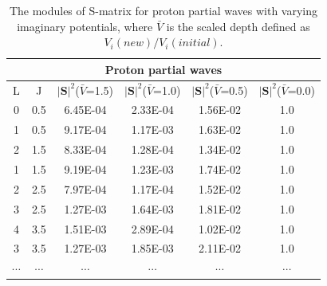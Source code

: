 	\begin{table}[]
\centering
\begin{tabular}{cccccc}
\toprule
\toprule
\multicolumn{6}{c}{Proton partial waves}                                                                         \\
 \midrule
L                     & J                     & $|\mathbf{S}|^2$($\bar{V}$=1.5) & $|\mathbf{S}|^2$($\bar{V}$=1.0) & $|\mathbf{S}|^2$($\bar{V}$=0.5) & $|\mathbf{S}|^2$($\bar{V}$=0.0) \\
0                     & 0.5                   & 6.45E-04                     & 2.33E-04                     & 1.56E-02                     & 1.0                          \\
1                     & 0.5                   & 9.17E-04                     & 1.17E-03                     & 1.63E-02                     & 1.0                          \\
2                     & 1.5                   & 8.33E-04                     & 1.28E-04                     & 1.34E-02                     & 1.0                          \\
1                     & 1.5                   & 9.19E-04                     & 1.23E-03                     & 1.74E-02                     & 1.0                          \\
2                     & 2.5                   & 7.97E-04                     & 1.17E-04                     & 1.52E-02                     & 1.0                          \\
3                     & 2.5                   & 1.27E-03                     & 1.64E-03                     & 1.81E-02                     & 1.0                          \\
4                     & 3.5                   & 1.51E-03                     & 2.89E-04                     & 1.02E-02                     & 1.0                          \\
3                     & 3.5                   & 1.27E-03                     & 1.85E-03                     & 2.11E-02     
	& 1.0                          \\
   
$\cdots$           &$\cdots$                    & $\cdots$                            & $\cdots$                           & $\cdots$                           & $\cdots$                                                                \\
\bottomrule
\bottomrule
\end{tabular}
\caption{The modules of S-matrix for proton partial waves with varying imaginary potentials, where $\bar{V}$ is the scaled depth defined as $V_i(new)/V_i(initial)$.}
\label{pSmatrix}
\end{table}

